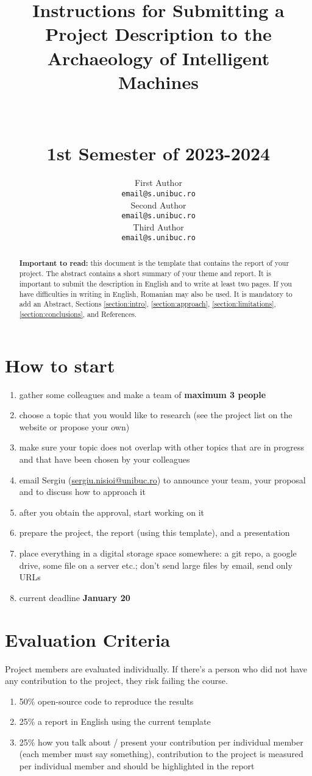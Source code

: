 \documentclass[11pt]{article}
\title{Instructions for Submitting a \\ Project Description to the \\
Archaeology of Intelligent Machines \\
		\hfill \\
		\hfill \\
		\small{1st Semester of 2023-2024}}
\author{First Author \\
  \texttt{email@s.unibuc.ro} \\\And
  Second Author \\
  \texttt{email@s.unibuc.ro} \\\And
  Third Author \\
  \texttt{email@s.unibuc.ro} \\}
\begin{document}
\maketitle
\begin{abstract}
\textbf{Important to read:} this document is the template that contains the report of your project. The abstract contains a short summary of your theme and report. It is important to submit the description in English and to write at least two pages. If you have difficulties in writing in English, Romanian may also be used. It is mandatory to add an Abstract, Sections \ref{section:intro}, \ref{section:approach}, \ref{section:limitations}, \ref{section:conclusions}, and References.
\end{abstract}


\section*{How to start}
\begin{enumerate}
	\item gather some colleagues and make a team of \textbf{maximum 3 people}
	\item choose a topic that you would like to research (see the project list on the website or propose your own)
	\item make sure your topic does not overlap with other topics that are in progress and that have been chosen by your colleagues
	\item email Sergiu (\url{sergiu.nisioi@unibuc.ro}) to announce your team, your proposal and to discuss how to approach it
	\item after you obtain the approval, start working on it
	\item prepare the project, the report (using this template), and a presentation
	\item place everything in a digital storage space somewhere: a git repo, a google drive, some file on a server etc.; don't send large files by email, send only URLs
	\item current deadline \textbf{January 20}
\end{enumerate}

\section*{Evaluation Criteria}
Project members are evaluated individually. If there's a person who did not have any contribution to the project, they risk failing the course.
\begin{enumerate}
	\item 50\% open-source code to reproduce the results
	\item 25\% a report in English using the current template 
	\item 25\% how you talk about / present your contribution per individual member (each member must say something), contribution to the project is measured per individual member and should be highlighted in the report
\end{enumerate}
\end{document}

